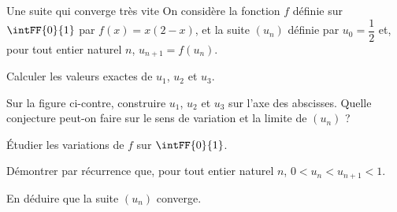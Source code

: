\begin{exercice}[3]{Une suite qui converge très vite}
On considère la fonction $f$ définie sur $\intFF{0}{1}$ par $f(x)=x(2-x)$, et la suite $(u_n)$
définie par $u_0=\dfrac{1}{2}$ et, pour tout entier naturel $n$, $u_{n+1}=f(u_n)$.

\noindent
\begin{minipage}[c]{0.56\linewidth}
\begin{questions}
  \item Calculer les valeurs exactes de $u_1$, $u_2$ et $u_3$.
  \item Sur la figure ci-contre, construire $u_1$, $u_2$ et $u_3$ sur l'axe des abscisses.
    Quelle conjecture peut-on faire sur le sens de variation et la limite de $(u_n)$ ?
\end{questions}
\begin{questions}[resume]
  \item Étudier les variations de $f$ sur $\intFF{0}{1}$.
  \item Démontrer par récurrence que, pour tout entier naturel $n$, $0<u_n<u_{n+1}<1$.
  \item En déduire que la suite $(u_n)$ converge.
\end{questions}
\end{minipage}\hfill
\begin{minipage}[c]{0.4\linewidth}
\centering
{}
\end{minipage}


\end{exercice}
